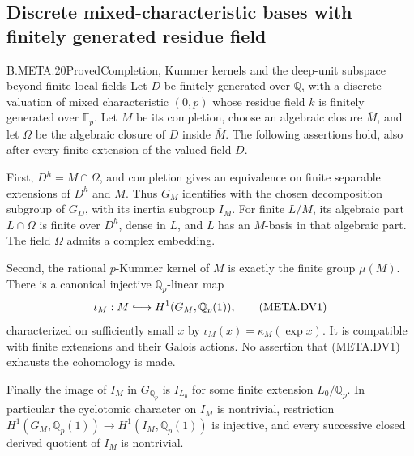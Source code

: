 \subsection{Discrete mixed-characteristic bases with finitely generated residue field}

\begin{claim}{B.META.20}{Proved}{Completion, Kummer kernels and the deep-unit subspace beyond finite local fields}
Let $D$ be finitely generated over $\mathbb Q$, with
a discrete valuation of mixed characteristic $(0,p)$
whose residue field $k$ is finitely generated over
$\mathbb F_p$.
Let $M$ be its completion, choose an algebraic closure
$\overline M$, and let $\Omega$ be the algebraic closure
of $D$ inside $\overline M$.
The following assertions hold, also after every finite
extension of the valued field $D$.

First, $D^h=M\cap\Omega$, and completion gives an
equivalence on finite separable extensions of $D^h$
and $M$.  Thus $G_M$ identifies with the chosen
decomposition subgroup of $G_D$, with its inertia
subgroup $I_M$.
For finite $L/M$, its algebraic part $L\cap\Omega$
is finite over $D^h$, dense in $L$, and $L$ has an
$M$-basis in that algebraic part.
The field $\Omega$ admits a complex embedding.

Second, the rational $p$-Kummer kernel of $M$ is
exactly the finite group $\mu(M)$.
There is a canonical injective $\mathbb Q_p$-linear map
\[
         \iota_M:M\lhook\joinrel\longrightarrow
                      H^1(G_M,\mathbb Q_p(1)),                 \tag{META.DV1}
\]
characterized on sufficiently small $x$ by
$\iota_M(x)=\kappa_M(\exp x)$.
It is compatible with finite extensions and their
Galois actions.
No assertion that (META.DV1) exhausts the cohomology
is made.

Finally the image of $I_M$ in $G_{\mathbb Q_p}$ is
$I_{L_0}$ for some finite extension $L_0/\mathbb Q_p$.
In particular the cyclotomic character on $I_M$ is
nontrivial, restriction
$H^1(G_M,\mathbb Q_p(1))\to H^1(I_M,\mathbb Q_p(1))$
is injective, and every successive closed derived
quotient of $I_M$ is nontrivial.
\end{claim}
